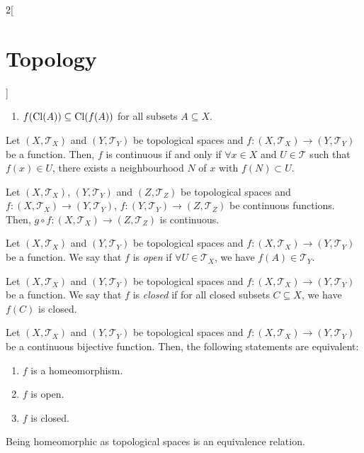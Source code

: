 \documentclass[../../../main.tex]{subfiles}
\begin{document}
\begin{multicols}{2}[\section{Topology}]
\begin{theorem}
\begin{enumerate}
      \item $f(\operatorname{Cl}(A))\subseteq \operatorname{Cl}(f(A))$ for all subsets $A\subseteq X$.
    \end{enumerate}
  \end{theorem}
  \begin{theorem}
    Let $(X,\mathcal{T}_X)$ and $(Y,\mathcal{T}_Y)$ be topological spaces and $f:(X,\mathcal{T}_X)\rightarrow (Y,\mathcal{T}_Y)$ be a function. Then, $f$ is continuous if and only if $\forall x\in X$ and $U\in\mathcal{T}$ such that $f(x)\in U$, there exists a neighbourhood $N$ of $x$ with $f(N)\subset U$.
  \end{theorem}
  \begin{prop}
    Let $(X,\mathcal{T}_X)$, $(Y,\mathcal{T}_Y)$ and $(Z,\mathcal{T}_Z)$ be topological spaces and $f:(X,\mathcal{T}_X)\rightarrow (Y,\mathcal{T}_Y)$, $f:(Y,\mathcal{T}_Y)\rightarrow (Z,\mathcal{T}_Z)$ be continuous functions. Then, $g\circ f:(X,\mathcal{T}_X)\rightarrow (Z,\mathcal{T}_Z)$ is continuous.
  \end{prop}
  \begin{definition}
    Let $(X,\mathcal{T}_X)$ and $(Y,\mathcal{T}_Y)$ be topological spaces and $f:(X,\mathcal{T}_X)\rightarrow (Y,\mathcal{T}_Y)$ be a function. We say that $f$ is \textit{open} if $\forall U\in\mathcal{T}_X$, we have $f(A)\in \mathcal{T}_Y$.
  \end{definition}
  \begin{definition}
    Let $(X,\mathcal{T}_X)$ and $(Y,\mathcal{T}_Y)$ be topological spaces and $f:(X,\mathcal{T}_X)\rightarrow (Y,\mathcal{T}_Y)$ be a function. We say that $f$ is \textit{closed} if for all closed subsets $C\subseteq X$, we have $f(C)$ is closed.
  \end{definition}
  \begin{prop}
    Let $(X,\mathcal{T}_X)$ and $(Y,\mathcal{T}_Y)$ be topological spaces and $f:(X,\mathcal{T}_X)\rightarrow (Y,\mathcal{T}_Y)$ be a continuous bijective function. Then, the following statements are equivalent:
    \begin{enumerate}
      \item $f$ is a homeomorphism.
      \item $f$ is open.
      \item $f$ is closed.
    \end{enumerate}
  \end{prop}
  \begin{prop}
    Being homeomorphic as topological spaces is an equivalence relation.
  \end{prop}

\end{multicols}
\end{document}
